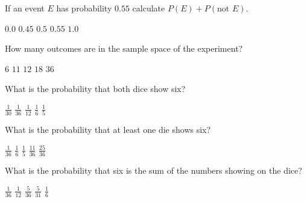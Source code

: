 \documentclass[answers,12pt]{exam}
\begin{document}
\begin{questions}
\question If an event $E$ has probability $0.55$
calculate $P\left(E\right)+P\left(\text{not $E$}\right)$.\\
\begin{oneparchoices}
\choice $0.0$
\choice $0.45$
\choice $0.5$
\choice $0.55$
\correctchoice $1.0$
\end{oneparchoices}


\question\label{FirstDice}
How many outcomes are in the sample space of the experiment?\\
\begin{oneparchoices}
\choice $6$ %
\choice $11$ %
\choice $12$ %
\choice $18$
\correctchoice $36$
\end{oneparchoices}

\question What is the probability that both dice show six?\\
\begin{oneparchoices}
\choice $\frac{1}{30}$ %
\correctchoice $\frac{1}{36}$
\choice $\frac{1}{12}$ %
\choice $\frac{1}{6}$
\choice $\frac{1}{5}$ %
\end{oneparchoices}

\question
What is the probability that at least one die shows six?\\
\begin{oneparchoices}
\choice $\frac{1}{36}$
\choice $\frac{1}{6}$
\choice $\frac{1}{5}$ %
\correctchoice $\frac{11}{36}$
\choice $\frac{25}{36}$ %
\end{oneparchoices}

\question\label{LastDice}
What is the probability that six is the sum of the numbers
showing on the dice?\\
\begin{oneparchoices}
\choice $\frac{1}{36}$
\choice $\frac{1}{12}$ %
\correctchoice $\frac{5}{36}$
\choice $\frac{5}{31}$ %
\choice $\frac{1}{6}$
\end{oneparchoices}



\end{questions}
\end{document}
